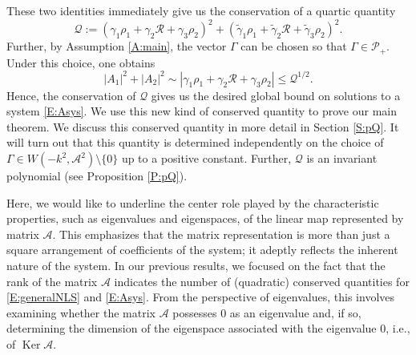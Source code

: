 \documentclass[11pt,a4paper,oneside]{amsart}
\theoremstyle{plain}
\theoremstyle{remark}
\numberwithin{equation}{section}
\def\le{\leqslant}
\def\ge{\geqslant}
\DeclareMathOperator{\Ker}{Ker}
\theoremstyle{definition}
\begin{document}
These two identities immediately give us the conservation of 
a quartic quantity
\begin{equation}\label{E:Q4def}
	\mathcal{Q}:=(\gamma_1 \rho_1 + \gamma_2 \mathcal{R} + \gamma_3 \rho_2)^2 + (\widetilde{\gamma}_1 \rho_1 + \widetilde{\gamma}_2 \mathcal{R} + \widetilde{\gamma}_3 \rho_2)^2.
\end{equation}
Further,
by Assumption \ref{A:main}, the vector $\Gamma$ can be chosen so that $\Gamma \in \mathcal{P}_+$.
Under this choice, one obtains
\[
	 |A_1|^2 + |A_2|^2 \sim |\gamma_1 \rho_1 + \gamma_2 \mathcal{R} + \gamma_3 \rho_2| \le \mathcal{Q}^{1/2} .
\]
Hence, the conservation of $\mathcal{Q}$ gives us the desired global bound on solutions to a system \eqref{E:Asys}. 
We use this new kind of conserved quantity to prove our main theorem.
We discuss this conserved quantity in more detail in Section \ref{S:pQ}.
It will turn out that this quantity is determined independently on the choice of $\Gamma \in W(-k^2,\mathscr{A}^2)\setminus\{0\}$ up to a positive constant. Further, $\mathcal{Q}$ is an invariant polynomial
(see Proposition \ref{P:pQ}).

%


Here, we would like to underline the center role played by the characteristic properties, such as eigenvalues and eigenspaces, of the linear map represented by matrix $\mathscr{A}$. This emphasizes that the matrix representation is more than just a square arrangement of coefficients of the system; it adeptly reflects the inherent nature of the system.
In our previous results, we focused on the fact that the rank of the matrix $\mathscr{A}$ indicates the number of (quadratic) conserved quantities for \eqref{E:generalNLS} and \eqref{E:Asys}. 
%
From the perspective of eigenvalues, this involves examining whether the matrix $\mathscr{A}$ possesses $0$ as an eigenvalue and, if so, determining the dimension of the eigenspace associated with the eigenvalue $0$, i.e., of $\Ker \mathscr{A}$.
%
%
\end{document}
